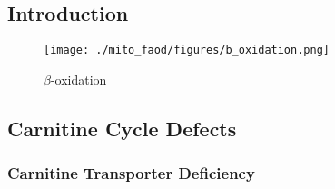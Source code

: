 \documentclass{scrartcl}
\begin{document}
\subsection{Introduction}
\label{sec:org8b5c293}
\begin{figure}[htbp]
\centering
\texttt{[image: ./mito\_faod/figures/b\_oxidation.png]}
\caption{\label{fig:orgec08761}
\(\beta\)-oxidation}
\end{figure}

\subsection{Carnitine Cycle Defects}
\label{sec:org7c985e4}
\subsubsection{Carnitine Transporter Deficiency}
\label{sec:orga3cc592}
\end{document}
